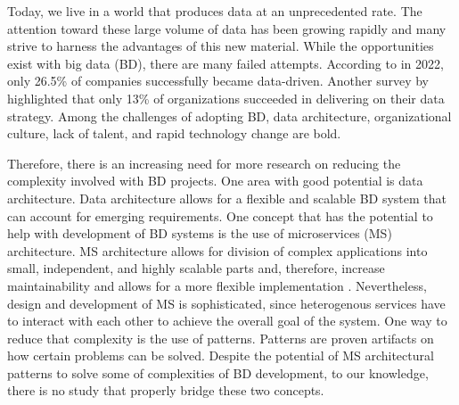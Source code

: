\documentclass[a4paper,11pt,article,oneside]{memoir}
\begin{document}
Today, we live in a world that produces data at an unprecedented rate. The attention toward these large volume of data has been growing rapidly and many strive to harness the advantages of this new material. While the opportunities exist with big data (BD), there are many failed attempts. According to \citet{NewVantageSurvey} in 2022, only 26.5\% of companies successfully became data-driven. Another survey by \citet{DataBricksSurvey} highlighted that only 13\% of organizations succeeded in delivering on their data strategy. Among the challenges of adopting BD, data architecture, organizational culture, lack of talent, and rapid technology change are bold. 

Therefore, there is an increasing need for more research on reducing the complexity involved with BD projects. One area with good potential is data architecture. Data architecture allows for a flexible and scalable BD system that can account for emerging requirements. One concept that has the potential to help with development of BD systems is the use of microservices (MS) architecture. MS architecture allows for division of complex applications into small, independent, and highly scalable parts and, therefore, increase maintainability and allows for a more flexible implementation \citep[p.~20]{Richardson.2022}. Nevertheless, design and development of MS is sophisticated, since heterogenous services have to interact with each other to achieve the overall goal of the system. One way to reduce that complexity is the use of patterns. Patterns are proven artifacts on how certain problems can be solved. Despite the potential of MS architectural patterns to solve some of complexities of BD development, to our knowledge, there is no study that properly bridge these two concepts. 






% 




\end{document}
